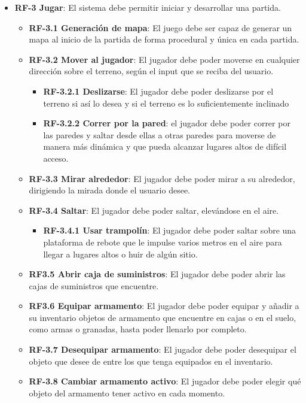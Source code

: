 \begin{itemize}
\begin{itemize}
    \end{itemize}
    \item \textbf{RF-3 Jugar}: El sistema debe permitir iniciar y desarrollar una partida.
    \begin{itemize}
        \item \textbf{RF-3.1 Generación de mapa}: El juego debe ser capaz de generar un mapa al inicio de la partida de forma procedural y única en cada partida.
        \item \textbf{RF-3.2 Mover al jugador}: El jugador debe poder moverse en cualquier dirección sobre el terreno, según el input que se reciba del usuario.
        \begin{itemize}
            \item \textbf {RF-3.2.1 Deslizarse}: El jugador debe poder deslizarse por el terreno si así lo desea y si el terreno es lo suficientemente inclinado
            \item \textbf{RF-3.2.2 Correr por la pared}: el jugador debe poder correr por las paredes y saltar desde ellas a otras paredes para moverse de manera más dinámica y que pueda alcanzar lugares altos de difícil acceso.
        \end{itemize}
        \item \textbf{RF-3.3 Mirar alrededor}: El jugador debe poder mirar a su alrededor, dirigiendo la mirada donde el usuario desee.
        \item \textbf{RF-3.4 Saltar}: El jugador debe poder saltar, elevándose en el aire.
        \begin{itemize}
            \item \textbf{RF-3.4.1 Usar trampolín}: El jugador debe poder saltar sobre una plataforma de rebote que le impulse varios metros en el aire para llegar a lugares altos o huir de algún sitio.
        \end{itemize}
        \item \textbf{RF3.5 Abrir caja de suministros}: El jugador debe poder abrir las cajas de suministros que encuentre.
        \item \textbf{RF3.6 Equipar armamento}: El jugador debe poder equipar y añadir a su inventario objetos de armamento que encuentre en cajas o en el suelo, como armas o granadas, hasta poder llenarlo por completo.
        \item \textbf{RF-3.7 Desequipar armamento}: El jugador debe poder desequipar el objeto que desee de entre los que tenga equipados en el inventario.
        \item \textbf{RF-3.8 Cambiar armamento activo}: El jugador debe poder elegir qué objeto del armamento tener activo en cada momento.

\end{itemize}
\end{itemize}
